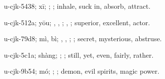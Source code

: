 \begin{multicols}{2}
{\cjkgGlue{}u-cjk-5438; xī; \cjkgGlue{}\cjkgGlue{}\cjkgGlue{}; \cjkgGlue{}; inhale, suck in, absorb, attract.

\cjkgGlue{}u-cjk-512a; yōu; \cjkgGlue{}\cjkgGlue{}\cjkgGlue{}, \cjkgGlue{}\cjkgGlue{}\cjkgGlue{}, \cjkgGlue{}\cjkgGlue{}\cjkgGlue{}; \cjkgGlue{}, \cjkgGlue{}; superior, excellent, actor.

\cjkgGlue{}u-cjk-79d8; mì, bì; \cjkgGlue{}\cjkgGlue{}\cjkgGlue{}, \cjkgGlue{}\cjkgGlue{}\cjkgGlue{}, \cjkgGlue{}\cjkgGlue{}\cjkgGlue{}; \cjkgGlue{}; secret, mysterious, abstruse.

\cjkgGlue{}u-cjk-5c1a; shàng; \cjkgGlue{}; \cjkgGlue{}; still, yet, even, fairly, rather.

\cjkgGlue{}u-cjk-9b54; mó; \cjkgGlue{}; \cjkgGlue{}; demon, evil spirits, magic power.

}
\end{multicols}

